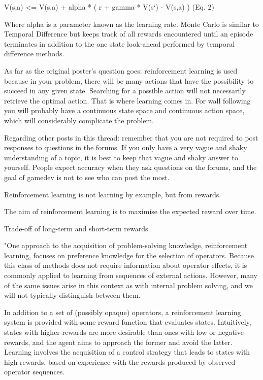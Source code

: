 \documentclass[a4paper,oneside]{report}
\begin{document}
V(s,a) <= V(s,a) + alpha * ( r + gamma * V(s`) - V(s,a) ) (Eq. 2)

Where alpha is a parameter known as the learning rate. Monte Carlo is similar to Temporal Difference but keeps track of all rewards encountered until an episode terminates in addition to the one state look-ahead performed by temporal difference methods.

As far as the original poster's question goes: reinforcement learning is used because in your problem, there will be many actions that have the possibility to succeed in any given state. Searching for a possible action will not necessarily retrieve the optimal action. That is where learning comes in. For wall following you will probably have a continuous state space and continuous action space, which will considerably complicate the problem.

Regarding other posts in this thread: remember that you are not required to post responses to questions in the forums. If you only have a very vague and shaky understanding of a topic, it is best to keep that vague and shaky answer to yourself. People expect accuracy when they ask questions on the forums, and the goal of gamedev is not to see who can post the most. 

Reinforcement learning is not learning by example, but from rewards.
 
The aim of reinforcement learning is to maximise the expected reward over time. 

Trade-off of long-term and short-term rewards. 

"One approach to the acquisition of problem-solving knowledge, reinforcement learning, focuses on preference knowledge for the selection of operators. Because this class of methods does not require information about operator effects, it is commonly applied to learning from sequences of external actions. However, many of the same issues arise in this context as with internal problem solving, and we will not typically distinguish between them.

In addition to a set of (possibly opaque) operators, a reinforcement learning system is provided with some reward function that evaluates states. Intuitively, states with higher rewards are more desirable than ones with low or negative rewards, and the agent aims to approach the former and avoid the latter. Learning involves the acquisition of a control strategy that leads to states with high rewards, based on experience with the rewards produced by observed operator sequences.
\end{document}
